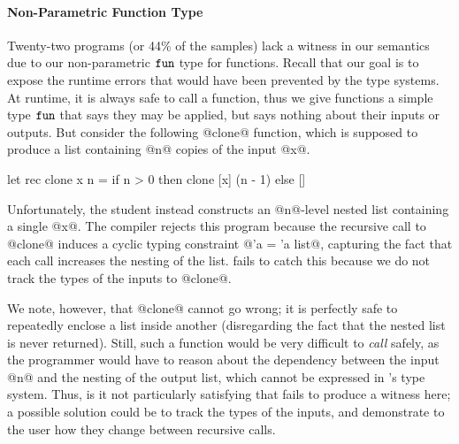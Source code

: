 \paragraph{Non-Parametric Function Type}
%
Twenty-two programs (or 44\% of the samples) lack a witness in our
semantics due to our non-parametric $\mathtt{fun}$ type for functions.
%
Recall that our goal is to expose the runtime errors that would have
been prevented by the type systems.
%
At runtime, it is always safe to call a function, thus we give functions
a simple type $\mathtt{fun}$ that says they may be applied, but says nothing
about their inputs or outputs.
%
But consider the following @clone@ function, which is supposed to
produce a list containing @n@ copies of the input @x@.
%
%
\begin{code}
  let rec clone x n =
    if n > 0 then
      clone [x] (n - 1)
    else
      []
\end{code}
%
Unfortunately, the student instead constructs an @n@-level nested list
containing a single @x@.
%
The \ocaml compiler rejects this program because the recursive call to
@clone@ induces a cyclic typing constraint @'a = 'a list@, capturing the
fact that each call increases the nesting of the list.
%
\toolname fails to catch this because we do not track the types of the
inputs to @clone@.

We note, however, that @clone@ cannot go wrong; it is perfectly safe to
repeatedly enclose a list inside another (disregarding the fact that the
nested list is never returned).
%
Still, such a function would be very difficult to \emph{call} safely, as
the programmer would have to reason about the dependency between the
input @n@ and the nesting of the output list, which cannot be expressed
in \ocaml's type system.
%
Thus, is it not particularly satisfying that \toolname fails to produce
a witness here; a possible solution could be to track the types of the
inputs, and demonstrate to the user how they change between recursive
calls.

